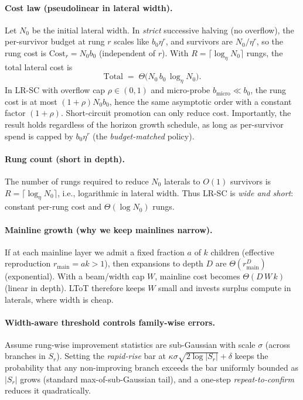 \documentclass{article}
\begin{document}
\paragraph{Cost law (pseudolinear in lateral width).}
Let $N_0$ be the initial lateral width.
In \emph{strict} successive halving (no overflow), the per-survivor budget at rung $r$ scales like $b_0\eta^r$, and survivors are $N_0/\eta^r$, so the rung cost is $\text{Cost}_r = N_0 b_0$ (independent of $r$).
With $R=\lceil\log_\eta N_0\rceil$ rungs, the total lateral cost is
\[
\boxed{~~\text{Total} \;=\; \Theta\!\big(N_0\,b_0\,\log_\eta N_0\big).~~}
\]
In LR-SC with overflow cap $\rho\in(0,1)$ and micro-probe $b_{\text{micro}}\ll b_0$, the rung cost is at most $(1+\rho)N_0 b_0$, hence the same asymptotic order with a constant factor $(1+\rho)$.
Short-circuit promotion can only reduce cost.
Importantly, the result holds regardless of the horizon growth schedule, as long as per-survivor spend is capped by $b_0\eta^r$ (the \emph{budget-matched} policy).

\paragraph{Rung count (short in depth).}
The number of rungs required to reduce $N_0$ laterals to $O(1)$ survivors is
$R=\lceil \log_\eta N_0\rceil$, i.e., logarithmic in lateral width.
Thus LR-SC is \emph{wide and short}: constant per-rung cost and $\Theta(\log N_0)$ rungs.

\paragraph{Mainline growth (why we keep mainlines narrow).}
If at each mainline layer we admit a fixed fraction $a$ of $k$ children (effective reproduction $r_{\text{main}}=ak>1$), then expansions to depth $D$ are $\Theta(r_{\text{main}}^D)$ (exponential).
With a beam/width cap $W$, mainline cost becomes $\Theta(D\,W\,k)$ (linear in depth).
LToT therefore keeps $W$ small and invests surplus compute in laterals, where width is cheap.

\paragraph{Width-aware threshold controls family-wise errors.}
Assume rung-wise improvement statistics are sub-Gaussian with scale $\sigma$ (across branches in $S_r$).
Setting the \emph{rapid-rise} bar at $\kappa\sigma\sqrt{2\log|S_r|}+\delta$ keeps the probability that any non-improving branch exceeds the bar uniformly bounded as $|S_r|$ grows (standard max-of-sub-Gaussian tail), and a one-step \emph{repeat-to-confirm} reduces it quadratically.
\end{document}
